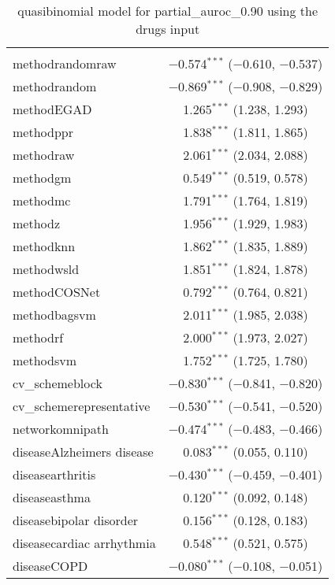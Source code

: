 
\begin{table}[!htbp] \centering 
  \caption{quasibinomial model for partial_auroc_0.90 using the drugs input} 
  \label{} 
\begin{tabular}{@{\extracolsep{5pt}}lc} 
\\[-1.8ex]\hline 
\hline \\[-1.8ex] 
 methodrandomraw & $-$0.574$^{***}$ ($-$0.610, $-$0.537) \\ 
  methodrandom & $-$0.869$^{***}$ ($-$0.908, $-$0.829) \\ 
  methodEGAD & 1.265$^{***}$ (1.238, 1.293) \\ 
  methodppr & 1.838$^{***}$ (1.811, 1.865) \\ 
  methodraw & 2.061$^{***}$ (2.034, 2.088) \\ 
  methodgm & 0.549$^{***}$ (0.519, 0.578) \\ 
  methodmc & 1.791$^{***}$ (1.764, 1.819) \\ 
  methodz & 1.956$^{***}$ (1.929, 1.983) \\ 
  methodknn & 1.862$^{***}$ (1.835, 1.889) \\ 
  methodwsld & 1.851$^{***}$ (1.824, 1.878) \\ 
  methodCOSNet & 0.792$^{***}$ (0.764, 0.821) \\ 
  methodbagsvm & 2.011$^{***}$ (1.985, 2.038) \\ 
  methodrf & 2.000$^{***}$ (1.973, 2.027) \\ 
  methodsvm & 1.752$^{***}$ (1.725, 1.780) \\ 
  cv\_schemeblock & $-$0.830$^{***}$ ($-$0.841, $-$0.820) \\ 
  cv\_schemerepresentative & $-$0.530$^{***}$ ($-$0.541, $-$0.520) \\ 
  networkomnipath & $-$0.474$^{***}$ ($-$0.483, $-$0.466) \\ 
  diseaseAlzheimers disease & 0.083$^{***}$ (0.055, 0.110) \\ 
  diseasearthritis & $-$0.430$^{***}$ ($-$0.459, $-$0.401) \\ 
  diseaseasthma & 0.120$^{***}$ (0.092, 0.148) \\ 
  diseasebipolar disorder & 0.156$^{***}$ (0.128, 0.183) \\ 
  diseasecardiac arrhythmia & 0.548$^{***}$ (0.521, 0.575) \\ 
  diseaseCOPD & $-$0.080$^{***}$ ($-$0.108, $-$0.051) \\ 

\end{tabular}
\end{table}
